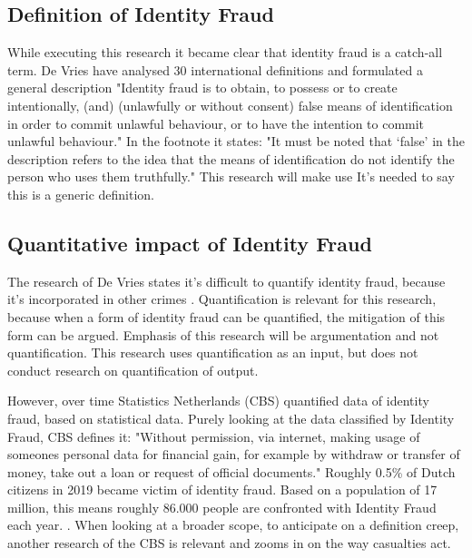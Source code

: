 \subsection{Definition of Identity Fraud}
While executing this research it became clear that identity fraud is a catch-all term. De Vries \etal \cite{97408536fd1c4f4e9d1615b7a4a4473e} have analysed 30 international definitions and formulated a general description "Identity fraud is to obtain, to possess or to create intentionally, (and) (unlawfully or without consent) false means of identification
in order to commit unlawful behaviour, or to have the intention to commit unlawful behaviour." In the footnote it states: "It must be noted that ‘false’ in the description refers to the idea that the means of identification do not identify the person who uses them truthfully."
This research will make use It's needed to say this is a generic definition. 

\subsection{Quantitative impact of Identity Fraud}
The research of De Vries \etal states it's difficult to quantify identity fraud, because it's incorporated in other crimes {\cite{Vries2007IdentiteitsfraudeEA}}{}. Quantification is relevant for this research, because when a form of identity fraud can be quantified, the mitigation of this form can be argued. Emphasis of this research will be argumentation and not quantification. This research uses quantification as an input, but does not conduct research on quantification of output. {}

However, over time Statistics Netherlands (CBS) quantified data of identity fraud, based on statistical data. Purely looking at the data classified by Identity Fraud, CBS defines it: "Without permission, via internet, making usage of someones personal data for financial gain, for example by withdraw or transfer of money, take out a loan or request of official documents." Roughly 0.5\% of Dutch citizens in 2019 became victim of identity fraud. Based on a population of 17 million, this means roughly 86.000 people are confronted with Identity Fraud each year. 
{}.
When looking at a broader scope, to anticipate on a definition creep, another research of the CBS is relevant {\cite{CBS_casualtiesDigitalCrime}} and zooms in on the way casualties act.

